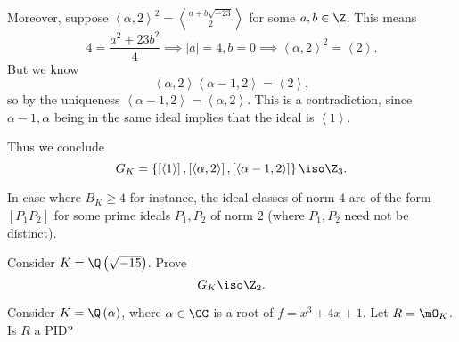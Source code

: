 \documentclass[pmath441]{subfiles}
\begin{document}
\begin{answer}
        Moreover, suppose $\left< \alpha,2 \right>^{2} = \left< \frac{a+b\sqrt{-23}}{2} \right>$ for some $a,b\in\Z$. This means
        \begin{equation*}
            4 = \frac{a^{2}+23b^{2}}{4} \implies \left| a \right| = 4, b=0 \implies \left< \alpha,2 \right>^{2} = \left< 2 \right>.  
        \end{equation*}
        But we know 
        \begin{equation*}
            \left< \alpha,2 \right>\left< \alpha-1,2 \right> = \left< 2 \right>, 
        \end{equation*}
        so by the uniqueness $\left< \alpha-1,2 \right> = \left< \alpha,2 \right>$. This is a contradiction, since $\alpha-1,\alpha$ being in the same ideal implies that the ideal is $\left< 1 \right>$.   

        Thus we conclude
        \begin{equation*}
            G_K = \left\lbrace \left[ \left< 1 \right>  \right], \left[ \left< \alpha,2 \right>  \right], \left[ \left< \alpha-1,2 \right>  \right] \right\rbrace \iso \Z_3.
        \end{equation*}
        
        \noindent
        \begin{minipage}{\textwidth}
        \end{minipage}
    \end{answer}
    
    \np In case where $B_K\geq 4$ for instance, the ideal classes of norm $4$ are of the form $\left[ P_1P_2 \right]$ for some prime ideals $P_1,P_2$ of norm $2$ (where $P_1,P_2$ need not be distinct).

    \begin{exercise}{}
        Consider $K=\Q\left( \sqrt{-15} \right)$. Prove
        \begin{equation*}
            G_K \iso \Z_2.
        \end{equation*}
    \end{exercise}

    \rruleline
    
    \begin{example}{}
        Consider $K=\Q\left( \alpha \right)$, where $\alpha\in\CC$ is a root of $f=x^{3}+4x+1$. Let $R=\mO_K$. Is $R$ a PID?
    \end{example}
\end{document}
